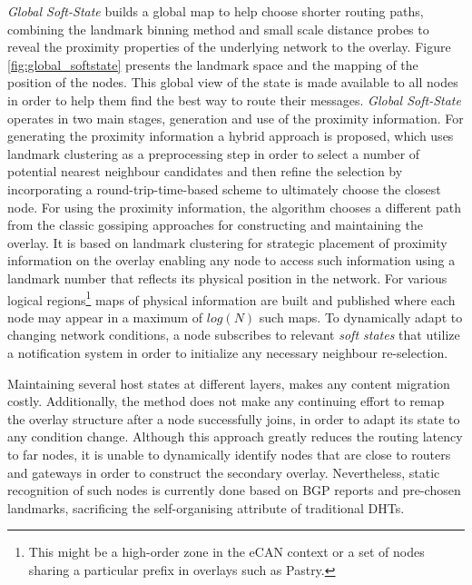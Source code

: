 \textit{Global Soft-State} \cite{XTZ2003} builds a global map to help
choose shorter routing paths, combining the landmark binning method and small
scale distance probes to reveal the proximity properties of the underlying
network to the overlay. Figure \ref{fig:global_softstate} presents the landmark
space and the mapping of the position of the nodes. This global view of the
state is made available to all nodes in order to help them find the best way to
route their messages. \textit{Global Soft-State} operates in two main stages,
generation and use of the proximity information. For generating the proximity
information a hybrid approach is proposed, which uses landmark clustering as a
preprocessing step in order to select a number of potential nearest neighbour
candidates and then refine the selection by incorporating a
round-trip-time-based scheme to ultimately choose the closest node. For using
the proximity information, the algorithm chooses a different path from the
classic gossiping approaches for constructing and maintaining the overlay. It is
based on landmark clustering for strategic placement of proximity information on
the overlay enabling any node to access such information using a landmark number
that reflects its physical position in the network. For various logical
regions\footnote{This might be a high-order zone in the eCAN\cite{xu_ecan_2002}
context or a set of nodes sharing a particular prefix in overlays such as
Pastry.} maps of physical information are built and published where each node
may appear in a maximum of $log\left( N \right)$ such maps. To dynamically adapt
to changing network conditions, a node subscribes to relevant \emph{soft states}
that utilize a notification system in order to initialize any necessary
neighbour re-selection.

Maintaining several host states at different layers, makes any content migration
costly. Additionally, the method does not make any continuing effort to remap
the overlay structure after a node successfully joins, in order to adapt its
state to any condition change. Although this approach greatly reduces the
routing latency to far nodes, it is unable to dynamically identify nodes that
are close to routers and gateways in order to construct the secondary overlay.
Nevertheless, static recognition of such nodes is currently done based on BGP
reports and pre-chosen landmarks, sacrificing the self-organising attribute of
traditional DHTs.

